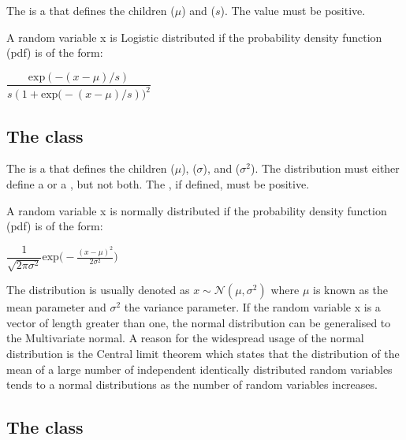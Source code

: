 The \LogisticDistribution is a \ContinuousUnivariateDistribution that defines the \UncertValue children  ($\mu$) and  ($s$).  The  value must be positive.

A random variable x is Logistic distributed if the probability density function (pdf) is of the form:

\begin{center}
$\dfrac{\mathrm{exp}(-(x-\mu)/s)}{s(1+\mathrm{exp}\big(-(x-\mu)/s)\big)^2}$
\end{center}

\subsection{The  class}
\label{NormalDistribution-class}
\label{normaldistribution-class}

The \NormalDistribution is a \ContinuousUnivariateDistribution that defines the \UncertValue children  ($\mu$),  ($\sigma$), and  ($\sigma^2$).  The distribution must either define a  or a , but not both.  The , if defined, must be positive.

A random variable x is normally distributed if the probability density function (pdf) is of the form:

\begin{center}
$\dfrac{1}{\sqrt{2\pi\sigma^2}}\mathrm{exp}\big(-\frac{(x-\mu)^2}{2\sigma^2}\big)$
\end{center}

The distribution is usually denoted as $x\sim \mathcal{N}(\mu,\sigma^2)$ where $\mu$ is known as the mean parameter and $\sigma^2$ the variance parameter. If the random variable x is a vector of length greater than one, the normal distribution can be generalised to the Multivariate normal.  A reason for the widespread usage of the normal distribution is the Central limit theorem which states that the distribution of the mean of a large number of independent identically distributed random variables tends to a normal distributions as the number of random variables increases.

\subsection{The  class}
\label{ParetoDistribution-class}
\label{paretodistribution-class}

